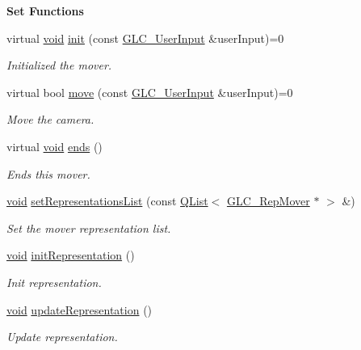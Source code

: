 \begin{Indent}{\bf Set Functions}\par
\begin{DoxyCompactItemize}
\item 
virtual \hyperlink{group___u_a_v_objects_plugin_ga444cf2ff3f0ecbe028adce838d373f5c}{void} \hyperlink{class_g_l_c___mover_aa42bf47dbe0181baebb33fd4901ea516}{init} (const \hyperlink{class_g_l_c___user_input}{G\-L\-C\-\_\-\-User\-Input} \&user\-Input)=0
\begin{DoxyCompactList}\small\item\em Initialized the mover. \end{DoxyCompactList}\item 
virtual bool \hyperlink{class_g_l_c___mover_a50797471a7a71612eef7d80f509f8a74}{move} (const \hyperlink{class_g_l_c___user_input}{G\-L\-C\-\_\-\-User\-Input} \&user\-Input)=0
\begin{DoxyCompactList}\small\item\em Move the camera. \end{DoxyCompactList}\item 
virtual \hyperlink{group___u_a_v_objects_plugin_ga444cf2ff3f0ecbe028adce838d373f5c}{void} \hyperlink{class_g_l_c___mover_a9483b8fb6f95a49de1f3f56e29763bd6}{ends} ()
\begin{DoxyCompactList}\small\item\em Ends this mover. \end{DoxyCompactList}\item 
\hyperlink{group___u_a_v_objects_plugin_ga444cf2ff3f0ecbe028adce838d373f5c}{void} \hyperlink{class_g_l_c___mover_a1a40b002963f10cbf90d238b0c1e069f}{set\-Representations\-List} (const \hyperlink{class_q_list}{Q\-List}$<$ \hyperlink{class_g_l_c___rep_mover}{G\-L\-C\-\_\-\-Rep\-Mover} $\ast$ $>$ \&)
\begin{DoxyCompactList}\small\item\em Set the mover representation list. \end{DoxyCompactList}\item 
\hyperlink{group___u_a_v_objects_plugin_ga444cf2ff3f0ecbe028adce838d373f5c}{void} \hyperlink{class_g_l_c___mover_a7ec77cceb13ae8bb8fd6c29715099a69}{init\-Representation} ()
\begin{DoxyCompactList}\small\item\em Init representation. \end{DoxyCompactList}\item 
\hyperlink{group___u_a_v_objects_plugin_ga444cf2ff3f0ecbe028adce838d373f5c}{void} \hyperlink{class_g_l_c___mover_aecb658727443c3ec29c0fa65b71309a8}{update\-Representation} ()
\begin{DoxyCompactList}\small\item\em Update representation. \end{DoxyCompactList}\end{DoxyCompactItemize}
\end{Indent}
